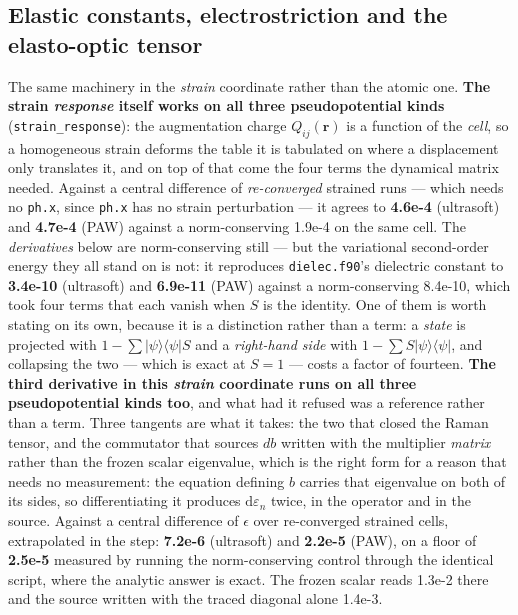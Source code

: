 \documentclass[11pt,a4paper]{article}
\newcommand{\code}[1]{\texttt{\small #1}}
\begin{document}
\subsection*{Elastic constants, electrostriction and the elasto-optic tensor}

The same machinery in the \emph{strain} coordinate rather than the atomic one.
\textbf{The strain \emph{response} itself works on all three pseudopotential kinds}
(\code{strain\_response}): the augmentation charge $Q_{ij}(\mathbf r)$ is a
function of the \emph{cell}, so a homogeneous strain deforms the table it is
tabulated on where a displacement only translates it, and on top of that come
the four terms the dynamical matrix needed. Against a central difference of
\emph{re-converged} strained runs --- which needs no \code{ph.x}, since
\code{ph.x} has no strain perturbation --- it agrees to \textbf{4.6e-4}
(ultrasoft) and \textbf{4.7e-4} (PAW) against a norm-conserving 1.9e-4 on the
same cell. The \emph{derivatives} below are norm-conserving still --- but the variational
second-order energy they all stand on is not: it reproduces \code{dielec.f90}'s
dielectric constant to \textbf{3.4e-10} (ultrasoft) and \textbf{6.9e-11} (PAW)
against a norm-conserving 8.4e-10, which took four terms that each vanish when
$S$ is the identity. One of them is worth stating on its own, because it is a
distinction rather than a term: a \emph{state} is projected with
$1 - \sum|\psi\rangle\langle\psi|S$ and a \emph{right-hand side} with
$1 - \sum S|\psi\rangle\langle\psi|$, and collapsing the two --- which is exact
at $S = 1$ --- costs a factor of fourteen. \textbf{The third derivative in this \emph{strain} coordinate runs on all three
pseudopotential kinds too}, and what had it refused was a reference rather than
a term. Three tangents are what it takes: the two that closed the Raman tensor,
and the commutator that sources $db$ written with the multiplier \emph{matrix}
rather than the frozen scalar eigenvalue, which is the right form for a reason
that needs no measurement: the equation defining $b$ carries that eigenvalue on
both of its sides, so differentiating it produces
$\mathrm{d}\varepsilon_n$ twice, in the operator and in the source. Against a
central difference of $\epsilon$ over re-converged strained cells,
extrapolated in the step: \textbf{7.2e-6} (ultrasoft) and \textbf{2.2e-5}
(PAW), on a floor of \textbf{2.5e-5} measured by running the norm-conserving
control through the identical script, where the analytic answer is exact.
The frozen scalar reads 1.3e-2 there and the source written with the traced
diagonal alone 1.4e-3.
\end{document}
